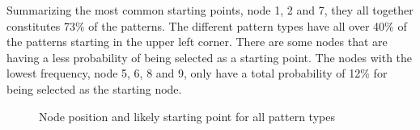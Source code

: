     Summarizing the most common starting points, node 1, 2 and 7, they all together constitutes 73\% of the patterns. The different pattern types have all over 40\% of the patterns starting in the upper left corner. There are some nodes that are having a less probability of being selected as a starting point. The nodes with the lowest frequency, node 5, 6, 8 and 9, only have a total probability of 12\% for being selected as the starting node.

    \begin{figure}[H]
      \centering
      \hspace{0.7cm}
      \caption{Node position and likely starting point for all pattern types}
      \label{fig:startingNode4}
    \end{figure}


